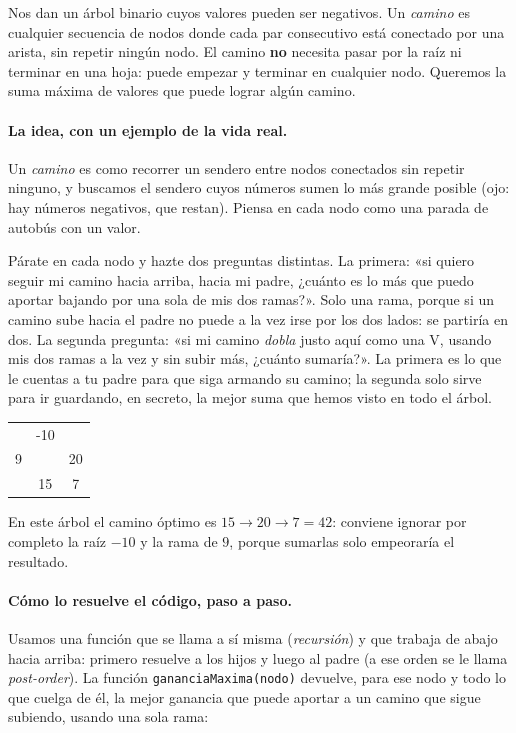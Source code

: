 
Nos dan un árbol binario cuyos valores pueden ser negativos. Un \emph{camino}
es cualquier secuencia de nodos donde cada par consecutivo está conectado por
una arista, sin repetir ningún nodo. El camino \textbf{no} necesita pasar por
la raíz ni terminar en una hoja: puede empezar y terminar en cualquier nodo.
Queremos la suma máxima de valores que puede lograr algún camino.

\paragraph{La idea, con un ejemplo de la vida real.} Un \emph{camino} es como
recorrer un sendero entre nodos conectados sin repetir ninguno, y buscamos el
sendero cuyos números sumen lo más grande posible (ojo: hay números negativos,
que restan). Piensa en cada nodo como una parada de autobús con un valor.

Párate en cada nodo y hazte dos preguntas distintas. La primera: «si quiero
seguir mi camino hacia arriba, hacia mi padre, ¿cuánto es lo más que puedo
aportar bajando por una sola de mis dos ramas?». Solo una rama, porque si un
camino sube hacia el padre no puede a la vez irse por los dos lados: se partiría
en dos. La segunda pregunta: «si mi camino \emph{dobla} justo aquí como una V,
usando mis dos ramas a la vez y sin subir más, ¿cuánto sumaría?». La primera es
lo que le cuentas a tu padre para que siga armando su camino; la segunda solo
sirve para ir guardando, en secreto, la mejor suma que hemos visto en todo el
árbol.

\begin{center}
\ttfamily
\begin{tabular}{ccc}
 & -10 & \\
9 & & 20\\
 & 15 & 7\\
\end{tabular}
\end{center}

\noindent En este árbol el camino óptimo es $15 \to 20 \to 7 = 42$: conviene
ignorar por completo la raíz $-10$ y la rama de $9$, porque sumarlas solo
empeoraría el resultado.

\paragraph{Cómo lo resuelve el código, paso a paso.} Usamos una función que se
llama a sí misma (\emph{recursión}) y que trabaja de abajo hacia arriba: primero
resuelve a los hijos y luego al padre (a ese orden se le llama \emph{post-order}).
La función \texttt{gananciaMaxima(nodo)} devuelve, para ese nodo y todo lo que
cuelga de él, la mejor ganancia que puede aportar a un camino que sigue subiendo,
usando una sola rama:

